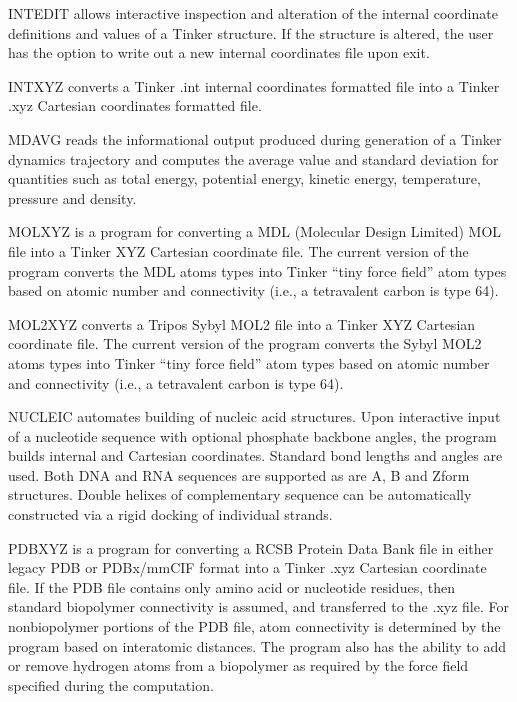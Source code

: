\documentclass[letterpaper,11pt,english]{sphinxmanual}
\begin{document}
\sphinxAtStartPar
INTEDIT allows interactive inspection and alteration of the internal coordinate definitions and values of a Tinker structure. If the structure is altered, the user has the option to write out a new internal coordinates file upon exit.

\sphinxAtStartPar
{}

\sphinxAtStartPar
INTXYZ converts a Tinker .int internal coordinates formatted file into a Tinker .xyz Cartesian coordinates formatted file.

\sphinxAtStartPar
{}

\sphinxAtStartPar
MDAVG reads the informational output produced during generation of a Tinker dynamics trajectory and computes the average value and standard deviation for quantities such as total energy, potential energy, kinetic energy, temperature, pressure and density.

\sphinxAtStartPar
{}

\sphinxAtStartPar
MOLXYZ is a program for converting a MDL (Molecular Design Limited) MOL file into a Tinker XYZ Cartesian coordinate file. The current version of the program converts the MDL atoms types into Tinker “tiny force field” atom types based on atomic number and connectivity (i.e., a tetravalent carbon is type 64).

\sphinxAtStartPar
{}

\sphinxAtStartPar
MOL2XYZ converts a Tripos Sybyl MOL2 file into a Tinker XYZ Cartesian coordinate file. The current version of the program converts the Sybyl MOL2 atoms types into Tinker “tiny force field” atom types based on atomic number and connectivity (i.e., a tetravalent carbon is type 64).

\sphinxAtStartPar
{}

\sphinxAtStartPar
NUCLEIC automates building of nucleic acid structures. Upon interactive input of a nucleotide sequence with optional phosphate backbone angles, the program builds internal and Cartesian coordinates. Standard bond lengths and angles are used. Both DNA and RNA sequences are supported as are A\sphinxhyphen{}, B\sphinxhyphen{} and Z\sphinxhyphen{}form structures. Double helixes of complementary sequence can be automatically constructed via a rigid docking of individual strands.

\sphinxAtStartPar
{}

\sphinxAtStartPar
PDBXYZ is a program for converting a RCSB Protein Data Bank file in either legacy PDB or PDBx/mmCIF format into a Tinker .xyz Cartesian coordinate file. If the PDB file contains only amino acid or nucleotide residues, then standard biopolymer connectivity is assumed, and transferred to the .xyz file. For non\sphinxhyphen{}biopolymer portions of the PDB file, atom connectivity is determined by the program based on interatomic distances. The program also has the ability to add or remove hydrogen atoms from a biopolymer as required by the force field specified during the computation.
\end{document}
